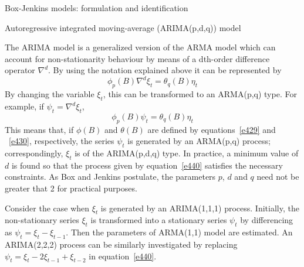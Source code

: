 \documentclass[8pt]{beamer}
\renewcommand{\emph}[1]{\textcolor{myorange}{#1}}
\begin{document}
\begin{frame}{Box-Jenkins models: formulation and identification}
    \begin{block}{Autoregressive integrated moving-average (ARIMA(p,d,q)) model}
    \end{block}
    The \alert{ARIMA} model is a generalized version of the \emph{ARMA} model which can account for non-stationarity behaviour by means of a dth-order difference operator $\nabla^d$. By using the notation explained above it can be represented by
    \begin{equation}
        \phi_p (B) \nabla^d \xi_t = \theta_q (B) \eta_t
        \label{e439}
    \end{equation}
    By changing the variable $\xi_t$, this can be transformed to an \emph{ARMA(p,q)} type. For example, if $\psi_t = \nabla^d \xi_t$,
    \begin{equation}
        \phi_p (B) \psi_t= \theta_q (B) \eta_t
        \label{e440}
    \end{equation}
    This means that, if $\phi(B)$ and $\theta(B)$ are defined by equations~\ref{e429} and ~\ref{e430}, respectively, the series $\psi_t$ is generated by an \emph{ARMA(p,q)} process; correspondingly, $\xi_t$ is of the \emph{ARIMA(p,d,q)} type. In practice, a \emph{minimum value} of $d$ is found so that the process given by equation~\ref{e440} satisfies the necessary constraints. As Box and Jenkins postulate, the parameters $p$, $d$ and $q$ need not be greater that 2 for practical purposes. 
    
    Consider the case when $\xi_t$ is generated by an \emph{ARIMA(1,1,1)} process. Initially, the non-stationary series $\xi_t$ is transformed into a stationary series $\psi_t$ by differencing as $\psi_t = \xi_t - \xi_{t-1}$. Then the parameters of \emph{ARMA(1,1)} model are estimated. An \emph{ARIMA(2,2,2)} process can be similarly investigated by replacing $\psi_t = \xi_t -2\xi_{t-1} + \xi_{t-2}$ in equation~\ref{e440}. 
\end{frame}
\end{document}
